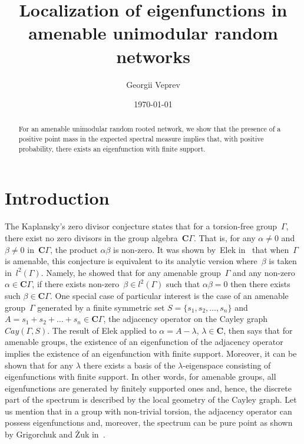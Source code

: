\documentclass[english]{article}
\title{Localization of eigenfunctions in amenable unimodular random networks}
\author{Georgii Veprev}
\date{\today}
\theoremstyle{definition}
\newcommand*{\field}[1]{\mathbf{#1}} %
\newcommand*\C{\field{C}} %
\begin{document}
\maketitle

\begin{abstract}
    For an amenable unimodular random rooted network, we show that the presence of a positive point mass in the expected spectral measure implies that, with positive probability, there exists an eigenfunction with finite support. 
\end{abstract}

\section{Introduction}



The Kaplansky’s zero divisor conjecture states that for a torsion-free group~$\Gamma$, there exist no zero divisors in the group algebra~$\C\Gamma$. That is, for any $\alpha \not = 0$ and~$\beta \not = 0$ in~$\C\Gamma$, the product $\alpha\beta$ is non-zero. It was shown by~Elek in~\cite{El} that when~$\Gamma$ is amenable, this conjecture is equivalent to its analytic version where~$\beta$ is taken in~$l^2(\Gamma)$. Namely, he showed that for any amenable group~$\Gamma$ and any non-zero $\alpha \in \C\Gamma$, if there exists non-zero~$\beta \in l^2(\Gamma)$ such that $\alpha \beta = 0$ then there exists such $\beta\in \C\Gamma$. One special case of particular interest is the case of an amenable group~$\Gamma$ generated by a finite symmetric set $S = \{s_1, s_2, \ldots, s_n\}$ and~$A = {s_1 + s_2 + \ldots + s_n} \in \C\Gamma$, the adjacency operator on the Cayley graph~$Cay(\Gamma,S)$. The result of Elek applied to $\alpha = A - \lambda$, $\lambda \in  \C$, then says that for amenable groups, the existence of an eigenfunction of the adjacency operator implies the existence of an eigenfunction with finite support. Moreover, it can be shown that for any $\lambda$ there exists a basis of the $\lambda$-eigenspace consisting of eigenfunctions with finite support. In other words, for amenable groups, all eigenfunctions are generated by finitely supported ones and, hence, the discrete part of the spectrum is described by the local geometry of the Cayley graph. Let us mention that in a group with non-trivial torsion, the adjacency operator can possess eigenfunctions and, moreover, the spectrum can be pure point as shown by Grigorchuk and \.Zuk in~\cite{GrZ}.
\end{document}
